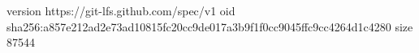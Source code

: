 version https://git-lfs.github.com/spec/v1
oid sha256:a857e212ad2e73ad10815fc20cc9de017a3b9f1f0cc9045ffc9cc4264d1c4280
size 87544
